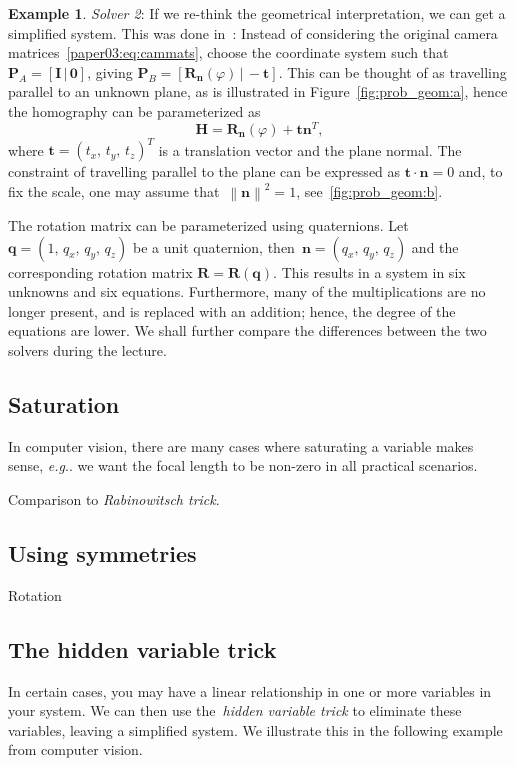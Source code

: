 \documentclass[11pt,a4paper]{article}
\makeatletter
\theoremstyle{definition}
\newtheorem{example}{Example}
\renewcommand{\phi}{\varphi}
\newcommand{\T}{T}
\newcommand{\mat}[1]{\bm{#1}}
\newcommand{\norm}[1]{\left\|#1\right\|}
\DeclareRobustCommand\eg{\emph{e.g}\@ifnextchar.{}{.\@}}
\makeatother
\begin{document}
\begin{example}
\emph{Solver 2}: If we re-think the geometrical interpretation, we can get a simplified system.
This was done in~\cite{valtonenoernhag-icpram-2019}:
Instead of considering the original camera matrices~\eqref{paper03:eq:cammats}, choose
the coordinate system such that
\mbox{$\mat{P}_A = [\mat{I}\,|\,\mat{0}]$},
giving $\mat{P}_B = [\mat{R}_{\mat{n}}(\phi)\,|\,-\mat{t}]$. This can be thought of
as travelling parallel to an unknown plane, as is illustrated in Figure~\ref{fig:prob_geom:a},
hence the homography can be parameterized as
\begin{equation}\label{paper03:eq:h}
    \mat{H}= \mat{R}_{\mat{n}}(\phi)+\mat{t}\mat{n}^{ \T},
\end{equation}
where $\mat{t}=(t_x,\,t_y,\,t_z)^{\T}$ is a translation vector and
\mbox{\smash {$\mat{n}=(n_x,\, n_y,\, n_z)^{\T}$}} the plane normal.
The constraint of travelling parallel
to the plane can be expressed as $\mat{t}\cdot\mat{n} = 0$ and, to fix the scale, one may
assume that~$\norm{\mat{n}}^2=1$, see~\cref{fig:prob_geom:b}.

The rotation matrix can be parameterized using quaternions. Let~$\mat{q}=(1,\,q_x,\,q_y,\,q_z)$
be a unit quaternion, then~$\mat{n}=(q_x,\,q_y,\,q_z)$
and the corresponding rotation matrix \mbox{$\mat{R}=\mat{R}(\mat{q})$}.
This results in a system in six unknowns and six equations. Furthermore, many of the multiplications
are no longer present, and is replaced with an addition; hence, the degree of the equations are
lower. We shall further compare the differences between the two solvers during the lecture.
\end{example}

\subsection{Saturation}
In computer vision, there are many cases where saturating a variable makes sense, \eg{}
we want the focal length to be non-zero in all practical scenarios.


Comparison to \emph{Rabinowitsch trick}.

\subsection{Using symmetries}
Rotation

\subsection{The hidden variable trick}
In certain cases, you may have a linear relationship in one or more variables in your system.
We can then use the~\emph{hidden variable trick} to eliminate these variables,
leaving a simplified system. We illustrate this in the following example from computer vision.
\end{document}
